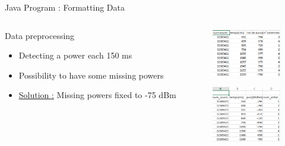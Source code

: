 \documentclass[utf8,compress]{beamer}
\begin{document}
\begin{frame}[containsverbatim]{Java Program : Formatting Data}
\begin{columns}
\begin{column}{0.5\textwidth}
   Data preprocessing
\vspace{1em}
    \begin{itemize}
    \item Detecting a power each 150 ms 
\vspace{0.8em} 
    \item Possibility to have some missing powers
\vspace{0.8em} 
    \item \underline {Solution :} Missing powers fixed to -75 dBm
  
    \end{itemize}
\end{column}
\begin{column}{0.5\textwidth}
    \begin{figure}[h]
        \includegraphics[width=3cm]{excel.png}
    \end{figure}
 \begin{figure}[h]
        \includegraphics[width=3cm]{excel2.png}
    \end{figure}
\end{column}
\end{columns}
\vspace{1em}
\end{frame}
\end{document}
